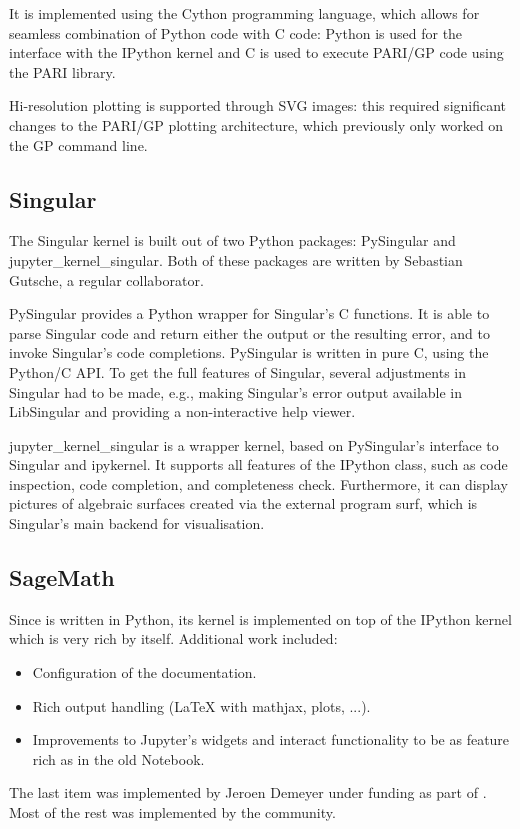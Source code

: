 \documentclass{deliverablereport}
\begin{document}
It is implemented using the Cython programming language,
which allows for seamless combination of Python code with C code:
Python is used for the interface with the IPython kernel and C is used to execute PARI/GP code
using the PARI library.

Hi-resolution plotting is supported through SVG images: this required significant changes to the PARI/GP
plotting architecture, which previously only worked on the GP command line.

\subsection{Singular}

The Singular kernel is built out of two Python packages: PySingular and jupyter\_kernel\_singular.
Both of these packages are written by Sebastian Gutsche, a regular
\ODK collaborator.

PySingular provides a Python wrapper for Singular's C functions.
It is able to parse Singular code and return either the
output or the resulting error, and to invoke Singular's code completions.
PySingular is written in pure C, using the Python/C API.
To get the full features of Singular, several adjustments in Singular had to be made,
e.g., making Singular's error output available in LibSingular and providing a non-interactive help viewer.

jupyter\_kernel\_singular is a wrapper kernel, based on PySingular's interface to Singular and ipykernel.
It supports all features of the IPython class, such as code inspection, code completion, and completeness check.
Furthermore, it can display pictures of algebraic surfaces
created via the external program surf, which is Singular's main backend for visualisation.

\subsection{SageMath}

Since \Sage is written in Python, its kernel is implemented
on top of the IPython kernel which is very rich by itself.
Additional work included:
\begin{itemize}
\item Configuration of the documentation.
\item Rich output handling (LaTeX with mathjax, plots, ...).
\item Improvements to Jupyter's widgets and interact functionality to be as feature rich as in the old \Sage Notebook.
\end{itemize}
The last item was implemented by Jeroen Demeyer under \ODK funding as part of .
Most of the rest was implemented by the \Sage community.
\end{document}
